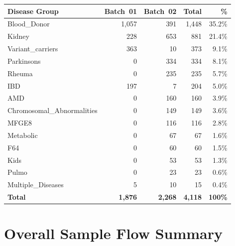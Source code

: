 \documentclass[11pt,a4paper]{article}
\begin{document}
{\footnotesize
\renewcommand{\arraystretch}{1.2}
\begin{longtable}{p{4cm}r r r r}
\toprule
\textbf{Disease Group} & \textbf{Batch~01} & \textbf{Batch~02}
  & \textbf{Total} & \textbf{\%} \\
\midrule
Blood\_Donor & 1,057 & 391 & 1,448 & 35.2\% \\
Kidney & 228 & 653 & 881 & 21.4\% \\
Variant\_carriers & 363 & 10 & 373 & 9.1\% \\
Parkinsons & 0 & 334 & 334 & 8.1\% \\
Rheuma & 0 & 235 & 235 & 5.7\% \\
IBD & 197 & 7 & 204 & 5.0\% \\
AMD & 0 & 160 & 160 & 3.9\% \\
Chromosomal\_Abnormalities & 0 & 149 & 149 & 3.6\% \\
MFGE8 & 0 & 116 & 116 & 2.8\% \\
Metabolic & 0 & 67 & 67 & 1.6\% \\
F64 & 0 & 60 & 60 & 1.5\% \\
Kids & 0 & 53 & 53 & 1.3\% \\
Pulmo & 0 & 23 & 23 & 0.6\% \\
Multiple\_Diseases & 5 & 10 & 15 & 0.4\% \\
\textbf{Total} & \textbf{1,876} & \textbf{2,268}
  & \textbf{4,118} & \textbf{100\%} \\
\bottomrule
\end{longtable}
\renewcommand{\arraystretch}{1.0}
}

\section{Overall Sample Flow Summary}
\end{document}
